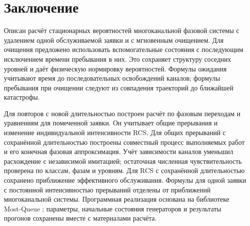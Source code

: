 \FloatBarrier
\section{Заключение}
Описан расчёт стационарных вероятностей многоканальной фазовой системы с удалением одной обслуживаемой заявки и с мгновенным очищением. Для очищения предложено использовать вспомогательные состояния с последующим исключением времени пребывания в них. Это сохраняет структуру соседних уровней и даёт физическую нормировку вероятностей. Формулы ожидания учитывают время до последовательных освобождений каналов; формулы пребывания при очищении следуют из совпадения траекторий до ближайшей катастрофы.

Для повторов с новой длительностью построен расчёт по фазовым переходам и уравнениям для помеченной заявки. Он учитывает общие прерывания и изменение индивидуальной интенсивности RCS. Для общих прерываний с сохранённой длительностью построены совместный процесс выполняемых работ и его конечная фазовая аппроксимация. Учёт зависимости каналов уменьшил расхождение с независимой имитацией; остаточная численная чувствительность проверена по классам, фазам и уровням. Для RCS с сохранённой длительностью сохранено приближение эффективного обслуживания. Формулы для одной заявки с постоянной интенсивностью прерываний отделены от приближений многоканальной системы. Программная реализация основана на библиотеке Most-Queue \cite{mostqueue2026}; параметры, начальные состояния генераторов и результаты прогонов сохранены вместе с материалами расчёта.

\printbibliography

